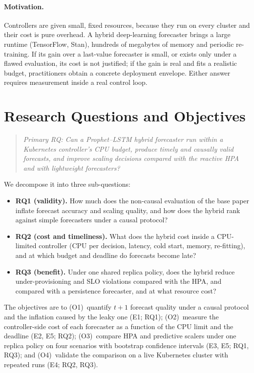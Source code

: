 \documentclass[conference,a4paper]{IEEEtran}
\begin{document}
\paragraph{Motivation.} Controllers are given small, fixed resources, because they run on every cluster and
their cost is pure overhead. A hybrid deep-learning forecaster brings a large runtime (TensorFlow, Stan), hundreds
of megabytes of memory and periodic re-training. If its gain over a last-value forecaster is small, or exists only
under a flawed evaluation, its cost is not justified; if the gain is real and fits a realistic budget,
practitioners obtain a concrete deployment envelope. Either answer requires measurement inside a real control loop.

\section{Research Questions and Objectives}\label{sec:rq}
\begin{quote}\itshape
Primary RQ: Can a Prophet--LSTM hybrid forecaster run within a Kubernetes controller's CPU budget, produce timely
and causally valid forecasts, and improve scaling decisions compared with the reactive HPA and with lightweight
forecasters?
\end{quote}
We decompose it into three sub-questions:
\begin{itemize}
\item \textbf{RQ1 (validity).} How much does the non-causal evaluation of the base paper inflate forecast accuracy
      and scaling quality, and how does the hybrid rank against simple forecasters under a causal protocol?
\item \textbf{RQ2 (cost and timeliness).} What does the hybrid cost inside a CPU-limited controller (CPU per
      decision, latency, cold start, memory, re-fitting), and at which budget and deadline do forecasts become
      late?
\item \textbf{RQ3 (benefit).} Under one shared replica policy, does the hybrid reduce under-provisioning and SLO
      violations compared with the HPA, and compared with a persistence forecaster, and at what resource cost?
\end{itemize}
The objectives are to (O1)~quantify $t{+}1$ forecast quality under a causal protocol and the inflation caused by
the leaky one (E1; RQ1); (O2)~measure the controller-side cost of each forecaster as a function of the CPU limit
and the deadline (E2, E5; RQ2); (O3)~compare HPA and predictive scalers under one replica policy on four
scenarios with bootstrap confidence intervals (E3, E5; RQ1, RQ3); and (O4)~validate the comparison on a live
Kubernetes cluster with repeated runs (E4; RQ2, RQ3).
\end{document}
